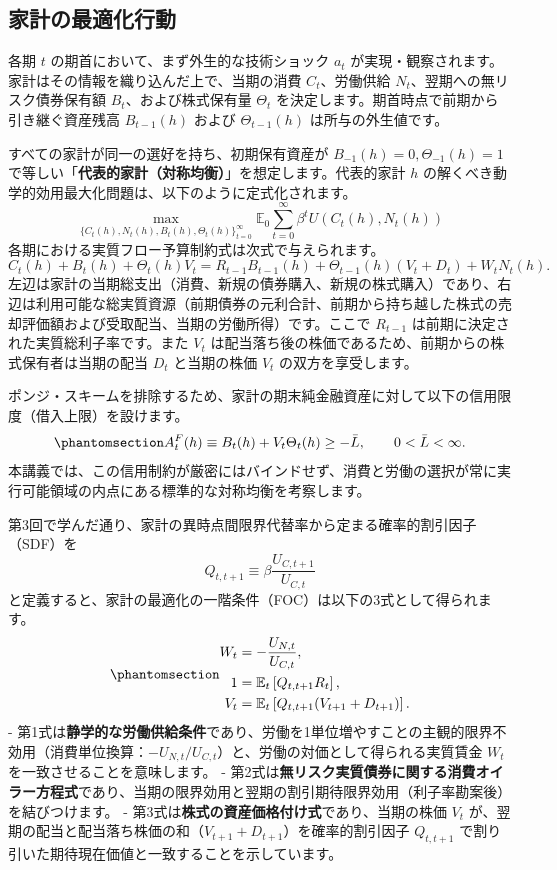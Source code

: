 \documentclass[
  japanese,
  lualatex,
  ja=standard,
  12pt,
  a4paper]{ltjsarticle}
\begin{document}
\subsection{家計の最適化行動}\label{ux5bb6ux8a08ux306eux6700ux9069ux5316ux884cux52d5}

各期 \(t\) の期首において、まず外生的な技術ショック \(a_t\)
が実現・観察されます。家計はその情報を織り込んだ上で、当期の消費
\(C_t\)、労働供給 \(N_t\)、翌期への無リスク債券保有額
\(B_t\)、および株式保有量 \(\Theta_t\)
を決定します。期首時点で前期から引き継ぐ資産残高 \(B_{t-1}(h)\) および
\(\Theta_{t-1}(h)\) は所与の外生値です。

すべての家計が同一の選好を持ち、初期保有資産が
\(B_{-1}(h)=0, \Theta_{-1}(h)=1\)
で等しい「\textbf{代表的家計（対称均衡）}」を想定します。代表的家計
\(h\) の解くべき動学的効用最大化問題は、以下のように定式化されます。 \[
\max_{\{C_t(h), N_t(h), B_t(h), \Theta_t(h)\}_{t=0}^{\infty}} \mathbb{E}_0 \sum_{t=0}^{\infty} \beta^t U(C_t(h), N_t(h))
\] 各期における実質フロー予算制約式は次式で与えられます。 \[
C_t(h) + B_t(h) + \Theta_t(h) V_t = R_{t-1} B_{t-1}(h) + \Theta_{t-1}(h) (V_t + D_t) + W_t N_t(h).
\]
左辺は家計の当期総支出（消費、新規の債券購入、新規の株式購入）であり、右辺は利用可能な総実質資源（前期債券の元利合計、前期から持ち越した株式の売却評価額および受取配当、当期の労働所得）です。ここで
\(R_{t-1}\) は前期に決定された実質総利子率です。また \(V_t\)
は配当落ち後の株価であるため、前期からの株式保有者は当期の配当 \(D_t\)
と当期の株価 \(V_t\) の双方を享受します。

ポンジ・スキームを排除するため、家計の期末純金融資産に対して以下の信用限度（借入上限）を設けます。
\begin{equation}\protect\phantomsection\label{eq-financial-credit-limit}{
A_t^F(h) \equiv B_t(h) + V_t \Theta_t(h) \geq -\bar{L}, \qquad 0 < \bar{L} < \infty.
}\end{equation}
本講義では、この信用制約が厳密にはバインドせず、消費と労働の選択が常に実行可能領域の内点にある標準的な対称均衡を考察します。

第3回で学んだ通り、家計の異時点間限界代替率から定まる確率的割引因子（SDF）を
\[
Q_{t,t+1} \equiv \beta \frac{U_{C,t+1}}{U_{C,t}}
\]
と定義すると、家計の最適化の一階条件（FOC）は以下の3式として得られます。
\begin{equation}\protect\phantomsection\label{eq-household-focs}{
\begin{aligned}
W_t &= -\frac{U_{N,t}}{U_{C,t}},\\
1 &= \mathbb{E}_t \left[ Q_{t,t+1} R_t \right],\\
V_t &= \mathbb{E}_t \left[ Q_{t,t+1} (V_{t+1} + D_{t+1}) \right].
\end{aligned}
}\end{equation} -
第1式は\textbf{静学的な労働供給条件}であり、労働を1単位増やすことの主観的限界不効用（消費単位換算：\(-U_{N,t}/U_{C,t}\)）と、労働の対価として得られる実質賃金
\(W_t\) を一致させることを意味します。 -
第2式は\textbf{無リスク実質債券に関する消費オイラー方程式}であり、当期の限界効用と翌期の割引期待限界効用（利子率勘案後）を結びつけます。
- 第3式は\textbf{株式の資産価格付け式}であり、当期の株価 \(V_t\)
が、翌期の配当と配当落ち株価の和（\(V_{t+1}+D_{t+1}\)）を確率的割引因子
\(Q_{t,t+1}\) で割り引いた期待現在価値と一致することを示しています。
\end{document}

